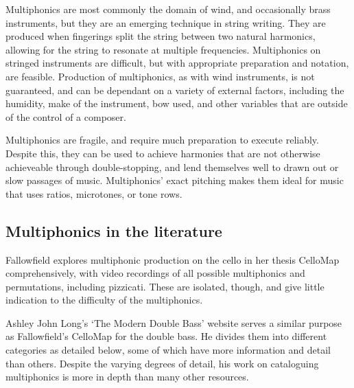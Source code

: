 Multiphonics are most commonly the domain of wind, and occasionally brass instruments, but they are an emerging technique in string writing. 
They are produced when fingerings split the string between two natural harmonics, allowing for the string to resonate at multiple frequencies.
Multiphonics on stringed instruments are difficult, but with appropriate preparation and notation, are feasible. 
Production of multiphonics, as with wind instruments, is not guaranteed, and can be dependant on a variety of external factors, including the humidity, make of the instrument, bow used, and other variables that are outside of the control of a composer. 

Multiphonics are fragile, and require much preparation to execute reliably. 
Despite this, they can be used to achieve harmonies that are not otherwise achieveable through double-stopping, and lend themselves well to drawn out or slow passages of music. 
Multiphonics' exact pitching makes them ideal for music that uses ratios, microtones, or tone rows. 

\subsection{Multiphonics in the literature}

Fallowfield explores multiphonic production on the cello in her thesis CelloMap comprehensively, with video recordings of all possible multiphonics and permutations, including pizzicati.\autocite{fallowfieldCelloMapHandbook2009} 
These are isolated, though, and give little indication to the difficulty of the multiphonics.

Ashley John Long's `The Modern Double Bass' website serves a similar purpose as Fallowfield's CelloMap for the double bass\autocite{longModernDoubleBass}. 
He divides them into different categories as detailed below, some of which have more information and detail than others. 
Despite the varying degrees of detail, his work on cataloguing multiphonics is more in depth than many other resources.

